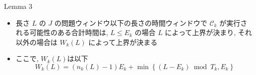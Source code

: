 
\begin{frame}[label=lemma4]{Lemma 3}
    \begin{lemma}[]
        \setlength{\linewidth}{0.98\columnwidth}
        \begin{itemize}
            \item 長さ $L$ の $J$ の問題ウィンドウ以下の長さの時間ウィンドウで $\mathcal{C}_{k}$ が実行される可能性のある合計時間は, $L \leq E_{k}$ の場合 $L$ によって上界が決まり, それ以外の場合は $W_{k}(L)$ によって上界が決まる
            \item ここで, $W_{k}(L)$は以下
                  \begin{equation*}
                      W_{k}(L)=\left(n_{k}(L)-1\right) E_{k}+\min \left\{\left(L-E_{k}\right) \bmod T_{k}, E_{k}\right\}
                  \end{equation*}
        \end{itemize}
    \end{lemma}
\end{frame}


